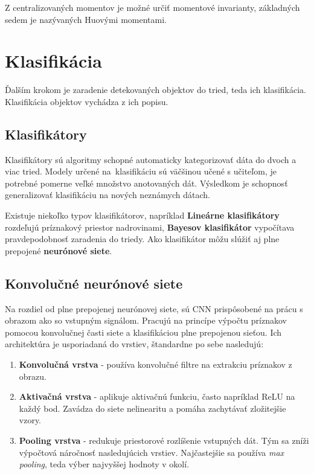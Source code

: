         Z centralizovaných momentov je možné určiť momentové invarianty, základných sedem je nazývaných Huovými momentami.

\chapter{Klasifikácia}

    Ďalším krokom je zaradenie detekovaných objektov do tried, teda ich klasifikácia. Klasifikácia objektov vychádza z ich popisu.

    \section{Klasifikátory}

        Klasifikátory sú algoritmy schopné automaticky kategorizovať dáta do dvoch a viac tried. Modely určené na~klasifikáciu sú väčšinou učené s učiteľom, je potrebné pomerne veľké množstvo anotovaných dát. Výsledkom je schopnosť generalizovať klasifikáciu na nových neznámych dátach.

        Existuje niekoľko typov klasifikátorov, napríklad \textbf{Lineárne klasifikátory} rozdeľujú príznakový priestor nadrovinami, \textbf{Bayesov klasifikátor} vypočítava pravdepodobnosť zaradenia do triedy. Ako klasifikátor môžu slúžiť aj plne prepojené \textbf{neurónové siete}.

    \section{Konvolučné neurónové siete}

        Na rozdiel od plne prepojenej neurónovej siete, sú \ac{CNN} prispôsobené na prácu s obrazom ako so vstupným signálom. Pracujú na princípe výpočtu príznakov pomocou konvolučnej časti siete a klasifikáciou plne prepojenou sieťou. Ich architektúra je usporiadaná do vrstiev, štandardne po sebe nasledujú:

        \begin{enumerate}
            \item \textbf{Konvolučná vrstva} - používa konvolučné filtre na extrakciu príznakov z obrazu.
            \item \textbf{Aktivačná vrstva} - aplikuje aktivačnú funkciu, často napríklad \ac{ReLU} na každý bod. Zavádza do siete nelinearitu a pomáha zachytávať zložitejšie vzory.
            \item \textbf{Pooling vrstva} - redukuje priestorové rozlíšenie vstupných dát. Tým sa zníži výpočtová náročnosť nasledujúcich vrstiev. Najčastejšie sa používa \emph{max pooling}, teda výber najvyššej hodnoty v okolí.
        \end{enumerate}

